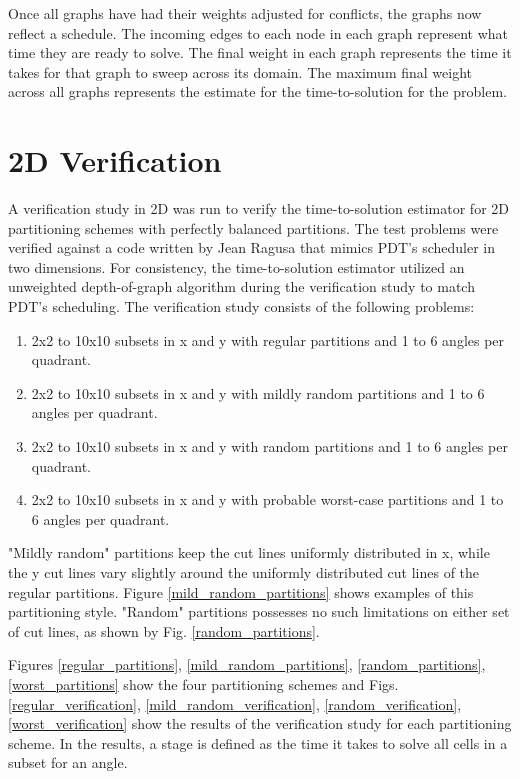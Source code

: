 Once all graphs have had their weights adjusted for conflicts, the graphs now reflect a schedule. The incoming edges to each node in each graph represent what time they are ready to solve. The final weight in each graph represents the time it takes for that graph to sweep across its domain. The maximum final weight across all graphs represents the estimate for the time-to-solution for the problem.

\section{2D Verification}

A verification study in 2D was run to verify the time-to-solution estimator for 2D partitioning schemes with perfectly balanced partitions. The test problems were verified against a code written by Jean Ragusa that mimics PDT's scheduler in two dimensions. For consistency, the time-to-solution estimator utilized an unweighted depth-of-graph algorithm during the verification study to match PDT's scheduling. The verification study consists of the following problems:
\begin{enumerate}
	\item 2x2 to 10x10 subsets in x and y with regular partitions and 1 to 6 angles per quadrant.
	\item 2x2 to 10x10 subsets in x and y with mildly random partitions and 1 to 6 angles per quadrant.
	\item  2x2 to 10x10 subsets in x and y with random partitions and 1 to 6 angles per quadrant.
	\item  2x2 to 10x10 subsets in x and y with probable worst-case partitions and 1 to 6 angles per quadrant.
\end{enumerate}

"Mildly random" partitions keep the cut lines uniformly distributed in x, while the y cut lines vary slightly around the uniformly distributed cut lines of the regular partitions. Figure \ref{mild_random_partitions} shows examples of this partitioning style. "Random" partitions possesses no such limitations on either set of cut lines, as shown by Fig. \ref{random_partitions}. 

Figures \ref{regular_partitions}, \ref{mild_random_partitions}, \ref{random_partitions}, \ref{worst_partitions} show the four partitioning schemes and Figs. \ref{regular_verification}, \ref{mild_random_verification}, \ref{random_verification}, \ref{worst_verification} show the results of the verification study for each partitioning scheme. In the results, a stage is defined as the time it takes to solve all cells in a subset for an angle.  

